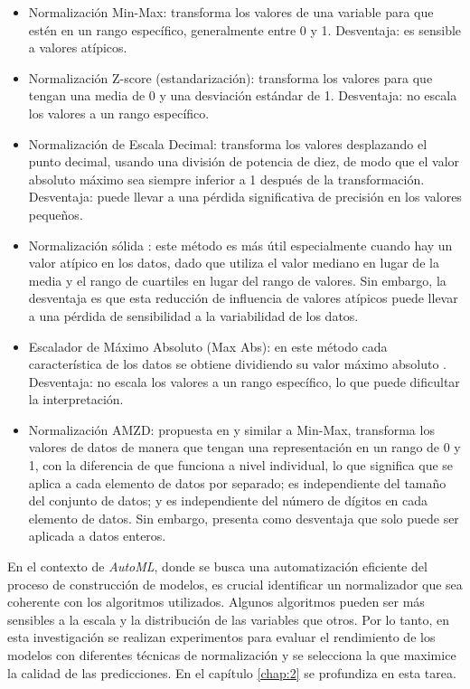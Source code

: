 \begin{itemize}
	\item Normalización Min-Max: transforma los valores de una variable para que estén en un rango específico, generalmente entre 0 y 1. Desventaja: es sensible a valores atípicos.
	\item Normalización Z-score (estandarización): transforma los valores para que tengan una media de 0 y una desviación estándar de 1. Desventaja: no escala los valores a un rango específico.
	\item Normalización de Escala Decimal: transforma los valores desplazando el punto decimal, usando una división de potencia de diez, de modo que el valor absoluto máximo sea siempre inferior a 1 después de la transformación. Desventaja: puede llevar a una pérdida significativa de precisión en los valores pequeños. 
	\item Normalización sólida \citep{polatgil2022investigation}: este método es más útil especialmente cuando hay un valor atípico en los datos, dado que utiliza el valor mediano en lugar de la media y el rango de cuartiles en lugar del rango de valores. Sin embargo, la desventaja es que esta reducción de influencia de valores atípicos puede llevar a una pérdida de sensibilidad a la variabilidad de los datos.
	\item Escalador de Máximo Absoluto (Max Abs): en este método cada característica de los datos se obtiene dividiendo su valor máximo absoluto \citep{polatgil2022investigation}. Desventaja: no escala los valores a un rango específico, lo que puede dificultar la interpretación.
	\item Normalización AMZD: propuesta en \citep{patro2015normalization} y similar a Min-Max, transforma los valores de datos de manera que tengan una representación en un rango de 0 y 1, con la diferencia de que funciona a nivel individual, lo que significa que se aplica a cada elemento de datos por separado; es independiente del tamaño del conjunto de datos; y
	es independiente del número de dígitos en cada elemento de datos. Sin embargo,  presenta como desventaja que solo puede ser aplicada a datos enteros.
\end{itemize}

En el contexto de \textit{AutoML}, donde se busca una automatización eficiente del proceso de construcción de modelos, es crucial identificar un normalizador que sea coherente con los algoritmos utilizados. Algunos algoritmos pueden ser más sensibles a la escala y la distribución de las variables que otros. Por lo tanto, en esta investigación se realizan experimentos para evaluar el rendimiento de los modelos con diferentes técnicas de normalización y se selecciona la que maximice la calidad de las predicciones. En el capítulo \ref{chap:2} se profundiza en esta tarea.

